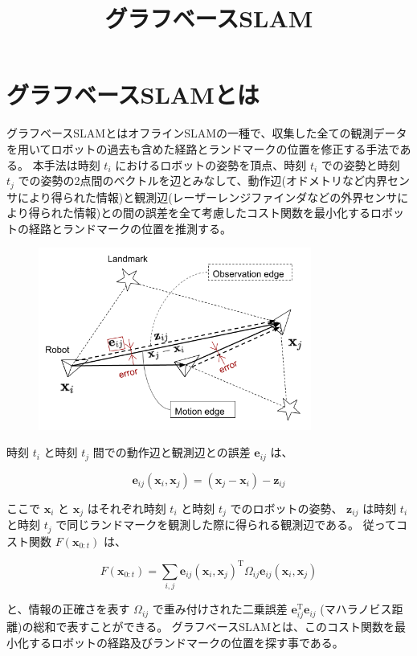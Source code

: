 \documentclass{article}
\title{グラフベースSLAM}
\date{}
\author{}
\begin{document}
\maketitle

\section{グラフベースSLAMとは}

グラフベースSLAMとはオフラインSLAMの一種で、収集した全ての観測データを用いてロボットの過去も含めた経路とランドマークの位置を修正する手法である。
本手法は時刻 $t_i$ におけるロボットの姿勢を頂点、時刻 $t_i$ での姿勢と時刻 $t_j$ での姿勢の2点間のベクトルを辺とみなして、動作辺(オドメトリなど内界センサにより得られた情報)と観測辺(レーザーレンジファインダなどの外界センサにより得られた情報)との間の誤差を全て考慮したコスト関数を最小化するロボットの経路とランドマークの位置を推測する。

\begin{figure}[h!]
  \centering
  \includegraphics[width=0.8\textwidth]{1-1_error_between_edges.png}
\end{figure}

時刻 $t_i$ と時刻 $t_j$ 間での動作辺と観測辺との誤差 $\bm{e}_{ij}$ は、

\[
\bm{e}_{ij}(\bm{x}_i, \bm{x}_j) = (\bm{x}_j - \bm{x}_i) - \bm{z}_{ij}
\]

ここで $\bm{x}_i$ と $\bm{x}_j$ はそれぞれ時刻 $t_i$ と時刻 $t_j$ でのロボットの姿勢、 $\bm{z}_{ij}$ は時刻 $t_i$ と時刻 $t_j$ で同じランドマークを観測した際に得られる観測辺である。
従ってコスト関数 $F(\bm{x}_{0:t})$ は、

\[
F(\bm{x}_{0:t}) = \sum_{i,j} \bm{e}_{ij}(\bm{x}_i, \bm{x}_j)^{\mathrm{T}} \Omega_{ij} \bm{e}_{ij}(\bm{x}_i, \bm{x}_j)
\]

と、情報の正確さを表す $\Omega_{ij}$ で重み付けされた二乗誤差 $\bm{e}_{ij}^{\mathrm{T}} \bm{e}_{ij}$ (マハラノビス距離)の総和で表すことができる。
グラフベースSLAMとは、このコスト関数を最小化するロボットの経路及びランドマークの位置を探す事である。
\end{document}
